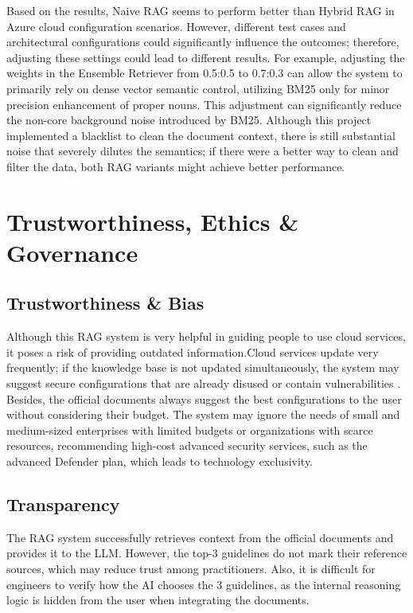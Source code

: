 \documentclass[11pt]{article}
\begin{document}
Based on the results, Naive RAG seems to perform better than Hybrid RAG in Azure cloud configuration scenarios. However, different test cases and architectural configurations could significantly influence the outcomes; therefore, adjusting these settings could lead to different results. For example, adjusting the weights in the Ensemble Retriever from 0.5:0.5 to 0.7:0.3 can allow the system to primarily rely on dense vector semantic control, utilizing BM25 only for minor precision enhancement of proper nouns. This adjustment can significantly reduce the non-core background noise introduced by BM25. Although this project implemented a blacklist to clean the document context, there is still substantial noise that severely dilutes the semantics; if there were a better way to clean and filter the data, both RAG variants might achieve better performance.

\section{Trustworthiness, Ethics \& Governance}

\subsection{Trustworthiness \& Bias}

Although this RAG system is very helpful in guiding people to use cloud services, it poses a risk of providing outdated information.Cloud services update very frequently; if the knowledge base is not updated simultaneously, the system may suggest secure configurations that are already disused or contain vulnerabilities \citep{vu2023freshllms}. Besides, the official documents always suggest the best configurations to the user without considering their budget. The system may ignore the needs of small and medium-sized enterprises with limited budgets or organizations with scarce resources, recommending high-cost advanced security services, such as the advanced Defender plan, which leads to technology exclusivity.

\subsection{Transparency}

The RAG system successfully retrieves context from the official documents and provides it to the LLM. However, the top-3 guidelines do not mark their reference sources, which may reduce trust among practitioners. Also, it is difficult for engineers to verify how the AI chooses the 3 guidelines, as the internal reasoning logic is hidden from the user when integrating the documents.
\end{document}
